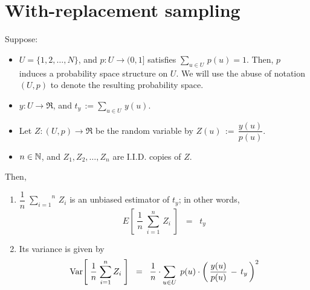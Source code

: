

\section{With-replacement sampling}
\setcounter{theorem}{0}
\setcounter{equation}{0}


\renewcommand{\theenumi}{\roman{enumi}}
\renewcommand{\labelenumi}{\textnormal{(\theenumi)}$\;\;$}


\begin{theorem}
\mbox{}\vskip 0.2cm
\noindent
Suppose:
\begin{itemize}
\item
	$U = \{1,2,\ldots,N\}$,
	\;and\;
	$p : U \longrightarrow (0,1]$ \;satisfies\; $\underset{u \in U}{\sum}\,p(u) = 1$.
	\vskip 0.1cm
	Then, $p$ induces a probability space structure on $U$.
	We will use the abuse of notation $(U,p)$ to denote the resulting probability space.
\item
	$y : U \longrightarrow \Re$, \;and\; $t_{y} \,:= \underset{u \in U}{\sum}\,y(u)$.
\item
	Let $Z : (U,p) \longrightarrow \Re$ be the random variable by\;
	$Z(u) \,:=\, \dfrac{y(u)}{p(u)}$.
\item
	$n \in \mathbb{N}$, \;and\; $Z_{1}, Z_{2}, \ldots, Z_{n}$ are I.I.D. copies of $Z$.
\end{itemize}
Then,
\begin{enumerate}
\item
	$\dfrac{1}{n}\;\overset{n}{\underset{i=1}{\sum}}\,Z_{i}$
	is an unbiased estimator of $t_{y}$;
	in other words,
	\begin{equation*}
	E\!\left[\;\dfrac{1}{n}\;\overset{n}{\underset{i=1}{\sum}}\,Z_{i}\;\right]
	\;\; = \;\;
		t_{y}
	\end{equation*}
\item
	Its variance is given by
	\begin{equation*}
	\textnormal{Var}\!\left[\;\dfrac{1}{n}\;\overset{n}{\underset{i=1}{\sum}}\,Z_{i}\;\right]
	\;\; = \;\;
		\dfrac{1}{n} \cdot \underset{u \in U}{\sum}\;\,p(u)\cdot\left(\,\dfrac{y(u)}{p(u)}\,-\,t_{y}\,\right)^{2}
	\end{equation*}
\end{enumerate}
\end{theorem}
